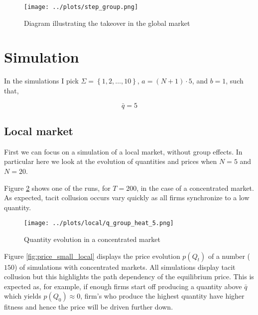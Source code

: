 \documentclass[american]{scrartcl}
\newcommand{\set}[1]{\left\{#1\right\}}
\begin{document}
\begin{center}
    \begin{figure}[h!]
        \center
        \texttt{[image: ../plots/step\_group.png]}
        \caption{Diagram illustrating the takeover in the global market}
        \label{fig:diagram}
    \end{figure}
\end{center}


\newpage
\section{Simulation}

In the simulations I pick $\Sigma = \set{1, 2, \ldots, 10}$, $a = (N + 1) \cdot 5$, and $b = 1$, such that,

\begin{equation}
    \bar{q} = 5
\end{equation}

\subsection{Local market}

First we can focus on a simulation of a local market, without group effects. In particular here we look at the evolution of quantities and prices when $N = 5$ and $N = 20$.

Figure \ref{fig:small_local} shows one of the runs, for $T = 200$, in the case of a concentrated market. As expected, tacit collusion occurs vary quickly as all firms synchronize to a low quantity.

\begin{center}
    \begin{figure}[h!]
        \center
        \texttt{[image: ../plots/local/q\_group\_heat\_5.png]}
        \caption{Quantity evolution in a concentrated market}
        \label{fig:small_local}
    \end{figure}
\end{center}

Figure \ref{fig:price_small_local} displays the price evolution $p(Q_t)$ of a number ($150$) of simulations with concentrated markets. All simulations display tacit collusion but this highlights the path dependency of the equilibrium price. This is expected as, for example, if enough firms start off producing a quantity above $\bar{q}$ which yields $p(Q_0) \approx 0$, firm's who produce the highest quantity have higher fitness and hence the price will be driven further down.
\end{document}
